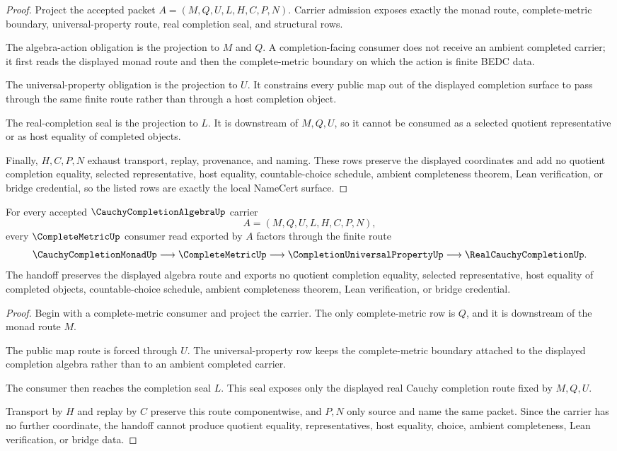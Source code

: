 \begin{proof}
Project the accepted packet $A=(M,Q,U,L,H,C,P,N)$. Carrier admission exposes exactly the monad route, complete-metric boundary, universal-property route, real completion seal, and structural rows.

The algebra-action obligation is the projection to $M$ and $Q$. A completion-facing consumer does not receive an ambient completed carrier; it first reads the displayed monad route and then the complete-metric boundary on which the action is finite BEDC data.

The universal-property obligation is the projection to $U$. It constrains every public map out of the displayed completion surface to pass through the same finite route rather than through a host completion object.

The real-completion seal is the projection to $L$. It is downstream of $M,Q,U$, so it cannot be consumed as a selected quotient representative or as host equality of completed objects.

Finally, $H,C,P,N$ exhaust transport, replay, provenance, and naming. These rows preserve the displayed coordinates and add no quotient completion equality, selected representative, host equality, countable-choice schedule, ambient completeness theorem, Lean verification, or bridge credential, so the listed rows are exactly the local NameCert surface.
\end{proof}

\begin{theorem}
\label{thm:cauchy-completion-algebra-complete-metric-handoff}
For every accepted $\CauchyCompletionAlgebraUp$ carrier
$$
A=(M,Q,U,L,H,C,P,N),
$$
every $\CompleteMetricUp$ consumer read exported by $A$ factors through the finite route
$$
\CauchyCompletionMonadUp \longrightarrow \CompleteMetricUp \longrightarrow \CompletionUniversalPropertyUp \longrightarrow \RealCauchyCompletionUp .
$$
The handoff preserves the displayed algebra route and exports no quotient completion equality, selected representative, host equality of completed objects, countable-choice schedule, ambient completeness theorem, Lean verification, or bridge credential.
\end{theorem}
\begin{proof}
Begin with a complete-metric consumer and project the carrier. The only complete-metric row is $Q$, and it is downstream of the monad route $M$.

The public map route is forced through $U$. The universal-property row keeps the complete-metric boundary attached to the displayed completion algebra rather than to an ambient completed carrier.

The consumer then reaches the completion seal $L$. This seal exposes only the displayed real Cauchy completion route fixed by $M,Q,U$.

Transport by $H$ and replay by $C$ preserve this route componentwise, and $P,N$ only source and name the same packet. Since the carrier has no further coordinate, the handoff cannot produce quotient equality, representatives, host equality, choice, ambient completeness, Lean verification, or bridge data.
\end{proof}


